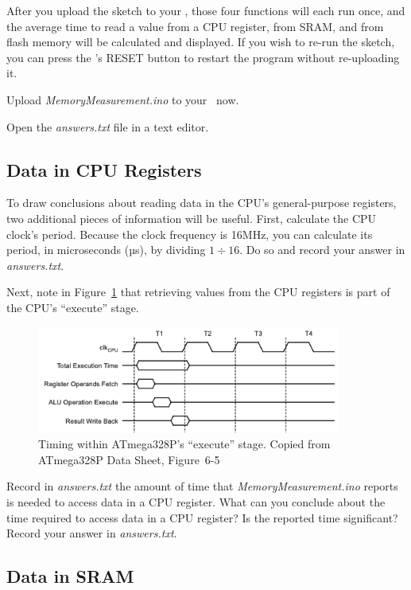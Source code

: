 After you upload the sketch to your \nano, those four functions will each run
once, and the average time to read a value from a CPU register, from SRAM, and
from flash memory will be calculated and displayed. If you wish to re-run the
sketch, you can press the \nano's RESET button to restart the program without
re-uploading it.

Upload \textit{MemoryMeasurement.ino} to your \nano\ now.

\vspace{.5cm}

Open the \textit{answers.txt} file in a text editor.

\subsection{Data in CPU Registers}

To draw conclusions about reading data in the CPU's general-purpose registers,
two additional pieces of information will be useful. First, calculate the CPU
clock's period. Because the clock frequency is 16MHz, you can calculate its
period, in microseconds (µs), by dividing $1 \div 16$. Do so and record your
answer in \textit{answers.txt}.

Next, note in Figure~\ref{fig:AluTiming} that retrieving values from
the CPU registers is part of the CPU's ``execute'' stage.

\begin{figure}
    \centering
    \includegraphics[width=10cm]{ATmega328P_AluTiming}
    \caption{Timing within ATmega328P's ``execute'' stage. \tiny Copied from ATmega328P Data Sheet, Figure~6-5 \label{fig:AluTiming}}
\end{figure}

Record in \textit{answers.txt} the amount of time that
\textit{MemoryMeasurement.ino} reports is needed to access data in a CPU
register. What can you conclude about the time required to access data in a CPU
register? Is the reported time significant? Record your answer in
\textit{answers.txt}.

\subsection{Data in SRAM}

